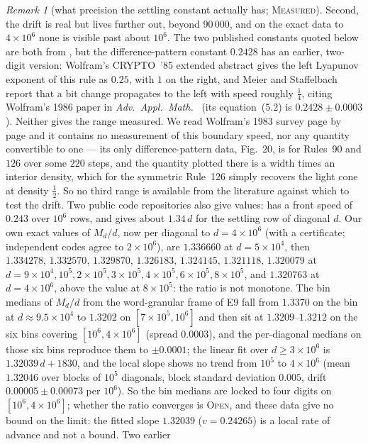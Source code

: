 \documentclass[11pt]{article}
\theoremstyle{definition}
\theoremstyle{remark}
\newtheorem{remark}[theorem]{Remark}
\newcommand{\MEASURED}{\textsc{Measured}}
\newcommand{\OPEN}{\textsc{Open}}
\begin{document}
\begin{remark}[what precision the settling constant actually has; \MEASURED]
Second, the drift is real but lives further out, beyond $90\,000$, and on the exact data to $4\times10^{6}$ none is
visible past about $10^{6}$. The two published constants quoted below are both from \cite{NKS}, but the difference-pattern
constant $0.2428$ has an earlier, two-digit version: Wolfram's CRYPTO~'85 extended abstract \cite{W85} gives the left Lyapunov exponent of this rule as $0.25$, with $1$ on the right, and Meier and
Staffelbach \cite[p.~191]{MS} report that a bit change propagates to the left with speed roughly $\tfrac14$, citing
Wolfram's 1986 paper in \emph{Adv.\ Appl.\ Math.}\ \cite{W86} (its equation~(5.2) is $0.2428\pm0.0003$). Neither gives the range measured. We read Wolfram's
1983 survey \cite{W83} page by page and it contains no measurement of this boundary speed, nor any
quantity convertible to one --- its only difference-pattern data, Fig.~20, is for Rules~90 and $126$
over some $220$ steps, and the quantity plotted there is a width times an interior density, which for
the symmetric Rule~126 simply recovers the light cone at density $\tfrac12$. So no third range is
available from the literature against which to test the drift. Two public code repositories also give values: \cite{Dib} has a front speed of $0.243$ over $10^{6}$ rows, and \cite{Pat} gives about $1.34\,d$ for the settling row of diagonal $d$. Our own exact values of $M_d/d$, now per diagonal to
$d=4\times10^{6}$ (with a certificate; independent codes agree to $2\times10^{6}$), are $1.336660$ at $d=5\times10^{4}$, then
$1.334278,\,1.332570,\,1.329870,\,1.326183,\,1.324145,\,1.321118,\,1.320079$ at
$d=9\times10^{4},10^{5},2\times10^{5},3\times10^{5},4\times10^{5},6\times10^{5},8\times10^{5}$, and $1.320763$ at
$d=4\times10^{6}$, above the value at $8\times10^{5}$: the ratio is not monotone. The bin medians of
$M_d/d$ from the word-granular frame of E9 fall from $1.3370$ on the bin at $d\approx9.5\times10^{4}$ to $1.3202$ on
$[7\times10^{5},10^{6}]$ and then sit at $1.3209$--$1.3212$ on the six bins covering $[10^{6},4\times10^{6}]$ (spread
$0.0003$), and the per-diagonal medians on those six bins reproduce them to $\pm0.0001$; the linear fit over
$d\ge3\times10^{6}$ is $1.32039\,d+1830$, and the local slope shows no trend from $10^{5}$ to $4\times10^{6}$ (mean $1.32046$
over blocks of $10^{5}$ diagonals, block standard deviation $0.005$, drift $0.00005\pm0.00073$ per $10^{6}$). So the bin
medians are locked to four digits on $[10^{6},4\times10^{6}]$; whether the ratio converges is \OPEN, and these data give no
bound on the limit: the fitted slope $1.32039$ ($v=0.24265$) is a local rate of advance and not a bound. Two earlier

\end{remark}
\end{document}
